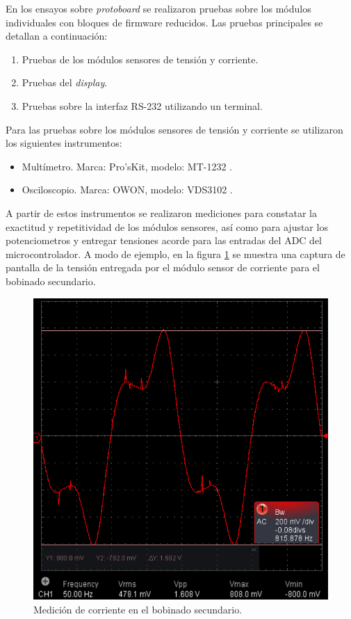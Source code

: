 En los ensayos sobre \textit{protoboard} se realizaron pruebas sobre los módulos individuales con bloques de firmware reducidos. Las pruebas principales se detallan a continuación:
\begin{enumerate}
	\item Pruebas de los módulos sensores de tensión y corriente.
	\item Pruebas del \textit{display}.
	\item Pruebas sobre la interfaz RS-232 utilizando un terminal.
\end{enumerate}

Para las pruebas sobre los módulos sensores de tensión y corriente se utilizaron los siguientes instrumentos:
\begin{itemize}
\item Multímetro. Marca: Pro'sKit, modelo: MT-1232 \citep{MT1232}.
\item Osciloscopio. Marca: OWON, modelo: VDS3102  \citep{VDS3102}.
\end{itemize}

A partir de estos instrumentos se realizaron mediciones para constatar la exactitud y repetitividad de los módulos sensores, así como para ajustar los potenciometros y entregar tensiones acorde para las entradas del ADC del microcontrolador. A modo de ejemplo, en la figura \ref{fig:ISOsc} se muestra una captura de pantalla de la tensión entregada por el módulo sensor de corriente para el bobinado secundario.

\begin{figure}[htpb]
	\centering
	\includegraphics[scale=0.6]{./Figures/osc_is.png}
	\caption{Medición de corriente en el bobinado secundario.}
	\label{fig:ISOsc}
\end{figure}

